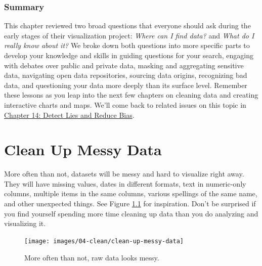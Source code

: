 \documentclass[
  english,
]{book}
\begin{document}
\hypertarget{summary3}{%
\subsection*{Summary}\label{summary3}}

This chapter reviewed two broad questions that everyone should ask during the early stages of their visualization project: \emph{Where can I find data?} and \emph{What do I really know about it?} We broke down both questions into more specific parts to develop your knowledge and skills in guiding questions for your search, engaging with debates over public and private data, masking and aggregating sensitive data, navigating open data repositories, sourcing data origins, recognizing bad data, and questioning your data more deeply than its surface level. Remember these lessons as you leap into the next few chapters on cleaning data and creating interactive charts and maps. We'll come back to related issues on this topic in \href{detect.html}{Chapter 14: Detect Lies and Reduce Bias}.

\hypertarget{clean}{%
\chapter{Clean Up Messy Data}\label{clean}}

More often than not, datasets will be messy and hard to visualize right away.
They will have missing values, dates in different formats, text in numeric-only columns, multiple items in the same columns, various spellings of the same name, and other unexpected things. See Figure \ref{fig:clean-up-messy-data} for inspiration. Don't be surprised if you find yourself spending more time cleaning up data than you do analyzing and visualizing it.



\begin{figure}
\texttt{[image: images/04-clean/clean-up-messy-data]} \caption{More often than not, raw data looks messy.}\label{fig:clean-up-messy-data}
\end{figure}
\end{document}
